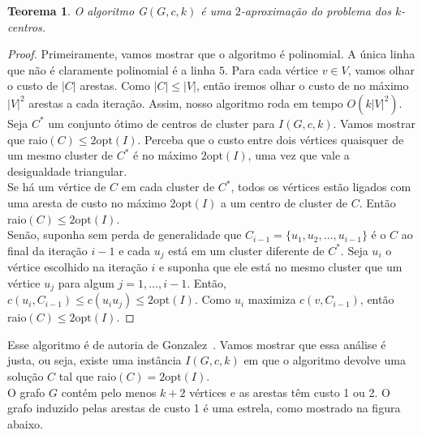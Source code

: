 \documentclass[12pt]{article}
\newcommand{\opt}{\ensuremath{\mathrm{opt}}}
\newtheorem{theorem}{Teorema}[section]
\begin{document}
    \begin{theorem}
        O algoritmo {\sc G}$(G,c,k)$ é uma $2$-aproximação do problema dos $k$-centros.
    \end{theorem}
    \begin{proof}
        Primeiramente, vamos mostrar que o algoritmo é polinomial. A única linha que não é claramente polinomial é a linha $5$. Para cada vértice $v \in V$, vamos olhar o custo de $|C|$ arestas. Como $|C| \leq |V|$, então iremos olhar o custo de no máximo $|V|^2$ arestas a cada iteração. Assim, nosso algoritmo roda em tempo $O(k|V|^2)$. \\
        Seja $C^*$ um conjunto ótimo de centros de cluster para $I(G,c,k)$. Vamos mostrar que raio$(C) \leq 2\opt(I) $. Perceba que o custo entre dois vértices quaisquer de um mesmo cluster de $C^*$ é no máximo $2\opt(I)$, uma vez que vale a desigualdade triangular.\\ 
        Se há um vértice de $C$ em cada cluster de $C^*$, todos os vértices estão ligados com uma aresta de custo no máximo $2\opt(I)$ a um centro de cluster de $C$. Então raio$(C) \leq 2\opt(I)$. \\
        Senão, suponha sem perda de generalidade que $C_{i-1} = \{ u_1,u_2,\ldots,u_{i-1}\}$ é o $C$ ao final da iteração $i-1$ e cada $u_j$ está em um cluster diferente de $C^*$. Seja $u_i$ o vértice escolhido na iteração $i$ e suponha que ele está no mesmo cluster que um vértice $u_j$ para algum $j=1,\ldots,i-1$. Então, $c(u_i,C_{i-1}) \leq c(u_iu_j) \leq 2\opt(I)$. Como $u_i$ maximiza $c(v,C_{i-1})$, então raio$(C) \leq 2\opt(I)$.
    \end{proof}
    Esse algoritmo é de autoria de Gonzalez~\cite{GONZALEZ1985293}.
    Vamos mostrar que essa análise é justa, ou seja, existe uma instância $I(G,c,k)$ em que o algoritmo devolve uma solução $C$ tal que raio$(C) = 2 \opt(I)$. \\
    O grafo $G$ contém pelo menos $k+2$ vértices e as arestas têm custo 1 ou 2. O grafo induzido pelas arestas de custo 1 é uma estrela, como mostrado na figura abaixo.
\end{document}
